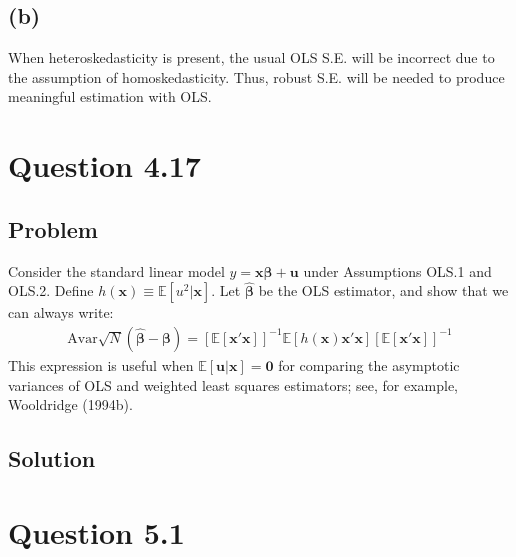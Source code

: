 \documentclass[10pt, a4paper]{article}
\begin{document}
    \subsection*{(b)}
      When heteroskedasticity is present, the usual OLS S.E. will be incorrect due to the assumption of homoskedasticity. Thus, robust S.E. will be needed to produce meaningful estimation with OLS.
\section*{Question 4.17}
  \subsection*{Problem}
    Consider the standard linear model $y = \boldsymbol{x}\boldsymbol{\beta} + \boldsymbol{u}$ under Assumptions OLS.1 and OLS.2. Define $h(\boldsymbol{x}) \equiv \mathbb{E}[u^2 | \boldsymbol{x}]$. Let $\hat{\boldsymbol{\beta}}$ be the OLS estimator, and show that we can always write:
    \begin{align}
    \text{Avar}\sqrt{N}(\hat{\boldsymbol{\beta}} - \boldsymbol{\beta}) = \left[\mathbb{E}[\boldsymbol{x}'\boldsymbol{x}]\right]^{-1} \mathbb{E}[h(\boldsymbol{x})\boldsymbol{x}'\boldsymbol{x}]\left[\mathbb{E}[\boldsymbol{x}'\boldsymbol{x}]\right]^{-1}
    \end{align}
    This expression is useful when $\mathbb{E}[\boldsymbol{u} | \boldsymbol{x}] = \boldsymbol{0}$ for comparing the asymptotic variances of OLS and weighted least squares estimators; see, for example, Wooldridge (1994b).
  \subsection*{Solution}
    
\section*{Question 5.1}
\end{document}
